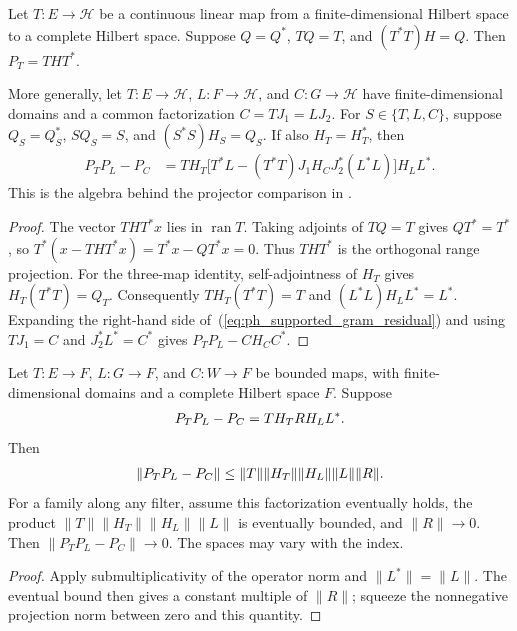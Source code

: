 \begin{lemma}
    \label{thm:supported_gram_projector_cancellation}
    \leanok
    Let $T:E\to\mathcal H$ be a continuous linear map from a finite-dimensional
    Hilbert space to a complete Hilbert space. Suppose $Q=Q^*$, $TQ=T$, and
    $(T^*T)H=Q$. Then $P_T=THT^*$.

    More generally, let $T:E\to\mathcal H$, $L:F\to\mathcal H$, and
    $C:G\to\mathcal H$ have finite-dimensional domains and a common
    factorization $C=TJ_1=LJ_2$. For $S\in\{T,L,C\}$, suppose
    $Q_S=Q_S^*$, $SQ_S=S$, and $(S^*S)H_S=Q_S$. If also $H_T=H_T^*$, then
    \begin{align}
        P_TP_L-P_C
         & =TH_T\bigl[T^*L-(T^*T)J_1H_CJ_2^*(L^*L)\bigr]H_LL^*.
        \label{eq:ph_supported_gram_residual}
    \end{align}
    This is the algebra behind the projector comparison in
    \cite[Lemma~6.1(ii)]{Nachtergaele1996Spectral}.
\end{lemma}
\begin{proof}\leanok
    The vector $THT^*x$ lies in $\operatorname{ran}T$. Taking adjoints of
    $TQ=T$ gives $QT^*=T^*$, so
    $T^*(x-THT^*x)=T^*x-QT^*x=0$. Thus $THT^*$ is the orthogonal range
    projection. For the three-map identity, self-adjointness of $H_T$ gives
    $H_T(T^*T)=Q_T$. Consequently
    $TH_T(T^*T)=T$ and $(L^*L)H_LL^*=L^*$.
    Expanding the right-hand side of~(\ref{eq:ph_supported_gram_residual})
    and using $TJ_1=C$ and $J_2^*L^*=C^*$ gives
    $P_TP_L-CH_CC^*$.
\end{proof}

\begin{lemma}
    \label{thm:supported_gram_projector_norm}
    \leanok
    Let $T:E\to F$, $L:G\to F$, and $C:W\to F$ be bounded
    maps, with finite-dimensional domains and a complete Hilbert space $F$.
    Suppose
    \begin{align}
        P_TP_L-P_C=T H_T R H_L L^*.
        \notag
    \end{align}
    Then
    \begin{align}
        \|P_TP_L-P_C\|
        \le \|T\|\|H_T\|\|H_L\|\|L\|\|R\|.
        \notag
    \end{align}
    For a family along any filter, assume this factorization eventually
    holds, the product $\|T\|\|H_T\|\|H_L\|\|L\|$ is eventually
    bounded, and $\|R\|\to0$. Then $\|P_TP_L-P_C\|\to0$.
    The spaces may vary with the index.
\end{lemma}
\begin{proof}\leanok
    Apply submultiplicativity of the operator norm and $\|L^*\|=\|L\|$.
    The eventual bound then gives a constant multiple of $\|R\|$;
    squeeze the nonnegative projection norm between zero and this quantity.
\end{proof}

